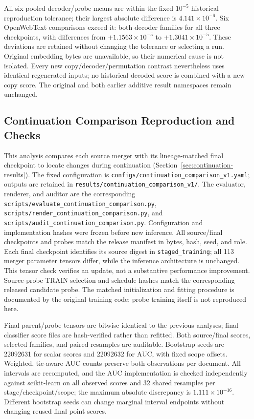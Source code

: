 \documentclass[10pt]{article}
\begin{document}
All six pooled decoder/probe means are within the fixed \(10^{-5}\)
historical reproduction tolerance; their largest absolute difference is
\(4.141\times10^{-6}\). Six OpenWebText comparisons exceed it: both decoder
families for all three checkpoints, with differences from
\(+1.1563\times10^{-5}\) to \(+1.3041\times10^{-5}\). These deviations are
retained without changing the tolerance or selecting a run. Original embedding
bytes are unavailable, so their numerical cause is not isolated. Every new
copy/decoder/permutation contrast nevertheless uses identical regenerated inputs;
no historical decoded score is combined with a new copy score. The original
and both earlier additive result namespaces remain unchanged.

\subsection{Continuation Comparison Reproduction and Checks}
\label{app:continuation-comparison}

This analysis compares each source merger with its lineage-matched final
checkpoint to locate changes during continuation
(Section~\ref{sec:continuation-results}). The fixed configuration is
\nolinkurl{configs/continuation_comparison_v1.yaml};
outputs are retained in \nolinkurl{results/continuation_comparison_v1/}.
The evaluator, renderer, and auditor are the corresponding
\nolinkurl{scripts/evaluate_continuation_comparison.py},
\nolinkurl{scripts/render_continuation_comparison.py}, and
\nolinkurl{scripts/audit_continuation_comparison.py}.
Configuration and implementation hashes were frozen before new inference.
All source/final checkpoints and probes match the release manifest in bytes,
hash, seed, and role. Each final checkpoint identifies its source digest in
\texttt{staged\_training}; all 113 merger parameter tensors differ, while the
inference architecture is unchanged. This tensor check verifies an update,
not a substantive performance improvement. Source-probe TRAIN selection and
schedule hashes match the corresponding released candidate probe. The matched
initialization and fitting procedure is documented by the original training
code; probe training itself is not reproduced here.

Final parent/probe tensors are bitwise identical to the previous analyses;
final classifier score files are hash-verified rather than refitted. Both
source/final scores, selected families, and paired resamples are auditable.
Bootstrap seeds are 22092631 for scalar scores and 22092632 for AUC, with fixed
scope offsets. Weighted, tie-aware AUC counts preserve both observations per
document. All intervals are recomputed, and the AUC implementation is checked
independently against scikit-learn on all observed scores and 32 shared
resamples per stage/checkpoint/scope; the maximum absolute discrepancy is
\(1.111\times10^{-16}\). Different bootstrap seeds can change marginal
interval endpoints without changing reused final point scores.
\end{document}
